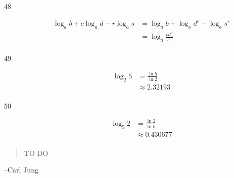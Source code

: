 \documentclass{exam}
\begin{document}
\begin{description}
      \item[48] 
        \begin{align*}
          \log_a b + c \log_a d - r \log_a s &= \log_a b + \log_a d^c - \log_a s^r \\
                                             &= \boxed{\log_a \frac{bd^c}{s^r}} \\
        \end{align*}

      \item[49] 
        \begin{align*}
          \log_2 5 &= \frac{\ln 5}{\ln 2} \\
                   &\approx \boxed{2.32193} \\
        \end{align*}

      \item[50] 
        \begin{align*}
          \log_5 2 &= \frac{\ln 2}{\ln 5} \\
                   &\approx \boxed{0.430677} \\
        \end{align*}

    \end{description}

  \else
    \vspace{2 cm}
    \begin{quote}
      \begin{em}
        TO DO
      \end{em}
    \end{quote}

    \hspace{1 cm} --Carl Jung
  \fi
\end{document}
